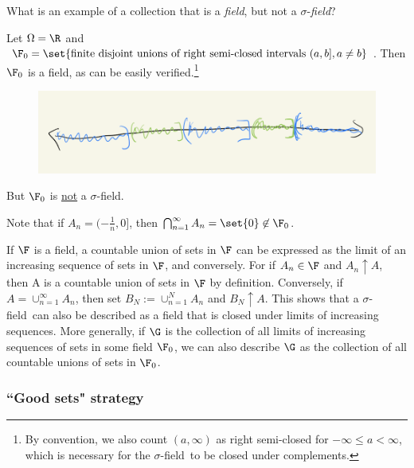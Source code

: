 \documentclass{article} %
\newif\ifActive
\renewcommand{\sf}{$\sigma$-field}
\begin{document}
\begin{example} What is an example of a collection that is a \textit{field}, but not a $\sigma$-\textit{field}?  

Let $\Omega=\R$ and $\F_0 = \set{\text{finite disjoint unions of right semi-closed intervals } (a,b], a \neq b}$.  Then $\F_0$ is a field, as can be easily verified.\footnote{By convention, we also count $(a, \infty)$ as right semi-closed for $-\infty\leq a < \infty$, which is necessary for the \sf\ to be closed under complements.}   

\begin{figure}[H]
\centering
\includegraphics[width=.6\textwidth]{images/rsc_intervals}	
\end{figure}

But $\F_0$ is \underline{not} a \sf.  

\ifActive 
\textbf{Workshop Exercise}: Prove this.
\else 
Note that if $A_n = (-\frac{1}{n},0]$, then $\bigcap_{n=1}^\infty A_n = \set{0}  \not\in \F_0$.
\fi 

\label{ex:field_of_finite_disjoint_unions_of_rsc_intervals}
\end{example}

\begin{remark}
 If $\F$ is a field, a countable union of sets in $\F$ can be expressed as the limit of an increasing sequence of sets in $\F$, and conversely. For if $A_n \in \F$ and $A_n \uparrow A$, then A is a countable union of sets in $\F$ by definition.  Conversely, if $A = \cup_{n=1}^\infty A_n$, then set $B_N := \cup_{n=1}^N A_n$ and $B_N \uparrow A$. This shows that a \sf\ can also be described as a field that is closed under limits of increasing sequences.  More generally, if $\G$ is the collection of all limits of increasing sequences of sets in some field $\F_0$, we can also describe $\G$ as the collection of all countable unions of sets in $\F_0$. \label{rk:the_limits_of_increasing_and_decreasing_sequences_of_sets_in_a_field_are_also_the_countable_unions}
\end{remark}


\subsubsection{``Good sets" strategy} \label{sec:good_sets_strategy}
\end{document}
